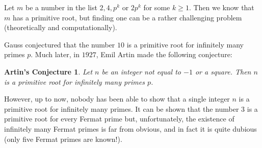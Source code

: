\documentclass[12pt]{article}
\newtheorem*{conj}{Artin's Conjecture}
\theoremstyle{definition}
\begin{document}
Let $m$ be a number in the list $2,4,p^k$ or $2p^k$ for some $k\geq 1$. Then we know that $m$ has a primitive root, but finding one can be a rather challenging problem (theoretically and computationally). 

Gauss conjectured that the number $10$ is a primitive root for infinitely many primes $p$. Much later, in $1927$, Emil Artin made the following conjecture:

\begin{conj}
Let $n$ be an integer not equal to $-1$ or a square. Then $n$ is a primitive root for infinitely many primes $p$.
\end{conj} 

However, up to now, nobody has been able to show that a single integer $n$ is a primitive root for infinitely many primes. It can be shown that the number $3$ is a primitive root for every Fermat prime but, unfortunately, the existence of infinitely many Fermat primes is far from obvious, and in fact it is quite dubious (only five Fermat primes are known!).
\end{document}
